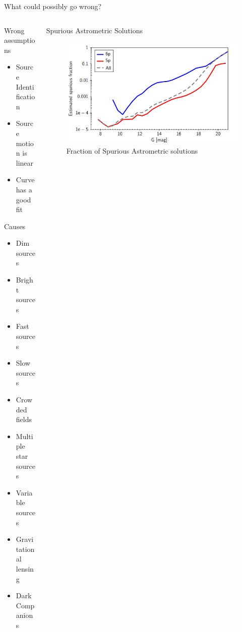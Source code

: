 \documentclass[hyperref={colorlinks = true, linkcolor=blue},8pt]{beamer}
\begin{document}
\begin{frame}{What could possibly go wrong?}

\begin{columns}
\begin{column}{0.4\columnwidth}
\large Wrong assumptions
\normalsize
	\begin{itemize}
	\item Source Identification
	\item Source motion is linear
	\item Curve has a good fit
	\end{itemize}	
\vspace{10pt}
\large Causes
\normalsize
	\begin{itemize}
	\item Dim sources
	\item Bright sources
	\item Fast sources
	\item Slow sources
	\item Crowded fields
	\item Multiple star sources
	\item Variable sources
	\item Gravitational lensing
	\item Dark Companions
	\end{itemize}
\end{column}
\begin{column}{0.6\columnwidth}
\center
\large Spurious Astrometric Solutions
\normalsize
		\begin{figure}
			\includegraphics[width=\columnwidth]{spuriousfraction.png}
			\caption{Fraction of Spurious Astrometric solutions \cite{fabriciusGaia2021}}
		\end{figure}\end{column}
\end{columns}
\end{frame}
\end{document}
